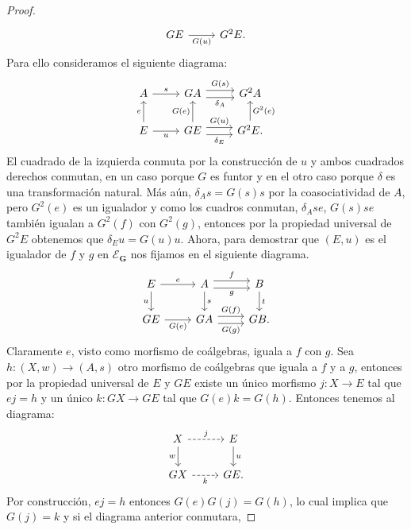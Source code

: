 \begin{proof}
\begin{equation*}
\begin{tikzcd}
      GE\ar[swap]{r}{G(u)} & G^2E.
    \end{tikzcd}
  \end{equation*}
  Para ello consideramos el siguiente diagrama:
  \begin{equation*}
    \begin{tikzcd}
      A\ar{r}{s} & GA\ar[shift left=0.75ex]{r}{G(s)}\ar[swap, shift right=0.75ex]{r}{\delta_A} & G^2A \\
      E\ar{u}{e}\ar[swap]{r}{u} & GE\ar[shift left=0.75ex]{r}{G(u)}\ar[swap, shift right=0.75ex]{r}{\delta_E}\ar{u}{G(e)} & G^2E.\ar[swap]{u}{G^2(e)}
    \end{tikzcd}
  \end{equation*}
  El cuadrado de la izquierda conmuta por la construcción de $u$ y ambos cuadrados derechos conmutan, en un caso
  porque $G$ es funtor y en el otro caso porque $\delta$ es una transformación natural. Más aún, $\delta_As=G(s)s$
  por la coasociatividad de $A$, pero $G^2(e)$ es un igualador y como los cuadros conmutan, $\delta_Ase$, $G(s)se$
  también igualan a $G^2(f)$ con $G^2(g)$, entonces por la propiedad universal
  de $G^2E$ obtenemos que $\delta_Eu=G(u)u$. Ahora, para demostrar que $(E,u)$ es el
  igualador de $f$ y $g$ en $\mathcal{E}_\textbf{G}$ nos fijamos en el siguiente diagrama.
  \begin{equation*}
    \begin{tikzcd}
      E\ar{r}{e}\ar[swap]{d}{u} & A\ar[shift left=0.75ex]{r}{f}\ar[swap, shift right=0.75ex]{r}{g}\ar{d}{s} & B\ar{d}{t} \\
      GE\ar[swap]{r}{G(e)} & GA\ar[shift left=0.75ex]{r}{G(f)}\ar[swap, shift right=0.75ex]{r}{G(g)} & GB.
    \end{tikzcd}
  \end{equation*}
  Claramente $e$, visto como morfismo de coálgebras, iguala a $f$ con $g$. Sea $h\colon (X,w)\to (A,s)$ otro morfismo
  de coálgebras que iguala a $f$ y a $g$, entonces por la propiedad universal de
  $E$ y $GE$ existe un único morfismo $j\colon X\to E$ tal que $ej=h$ y un único $k\colon GX\to GE$ tal que $G(e)k=G(h)$. Entonces tenemos al diagrama:
  \begin{equation*}
    \begin{tikzcd}
      X\ar[dashed]{r}{j}\ar[swap]{d}{w} & E\ar{d}{u} \\
      GX\ar[swap,dashed]{r}{k} & GE.
    \end{tikzcd}
  \end{equation*}
  Por construcción, $ej=h$ entonces $G(e)G(j)=G(h)$, lo cual implica que $G(j)=k$ y si el diagrama anterior conmutara, 

\end{proof}
